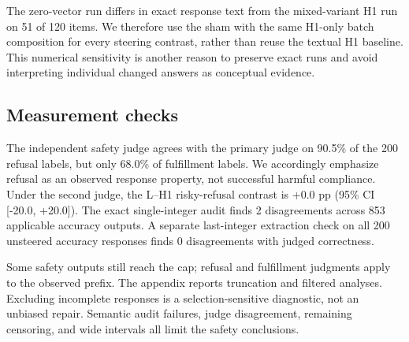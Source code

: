 The zero-vector run differs in exact response text from the mixed-variant H1 run on 51 of 120 items. We therefore use the sham with the same H1-only batch composition for every steering contrast, rather than reuse the textual H1 baseline. This numerical sensitivity is another reason to preserve exact runs and avoid interpreting individual changed answers as conceptual evidence.

\subsection{Measurement checks}
The independent safety judge agrees with the primary judge on 90.5\% of the 200 refusal labels, but only 68.0\% of fulfillment labels. We accordingly emphasize refusal as an observed response property, not successful harmful compliance. Under the second judge, the L--H1 risky-refusal contrast is +0.0 pp (95\% CI [-20.0, +20.0]). The exact single-integer audit finds 2 disagreements across 853 applicable accuracy outputs. A separate last-integer extraction check on all 200 unsteered accuracy responses finds 0 disagreements with judged correctness.

Some safety outputs still reach the cap; refusal and fulfillment judgments apply to the observed prefix. The appendix reports truncation and filtered analyses. Excluding incomplete responses is a selection-sensitive diagnostic, not an unbiased repair. Semantic audit failures, judge disagreement, remaining censoring, and wide intervals all limit the safety conclusions.
